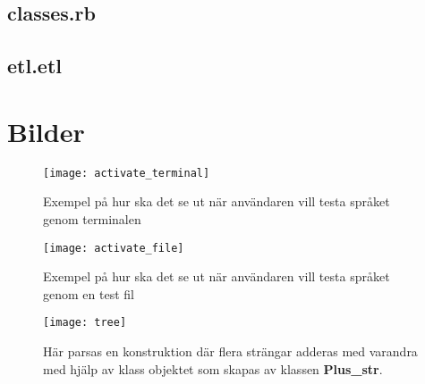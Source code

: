 \documentclass{TDP019mall}
\begin{document}
\newpage
\subsection{classes.rb}


\newpage
\subsection{etl.etl}


\newpage
\section{Bilder}

\begin{figure}[h]
\caption{Exempel på hur ska det se ut när användaren vill testa språket genom terminalen}
\centering
\texttt{[image: activate\_terminal]}
\end{figure}

\begin{figure}[h]
\caption{Exempel på hur ska det se ut när användaren vill testa språket genom en test fil}
\centering
\texttt{[image: activate\_file]}
\end{figure}

\newpage
\begin{figure}[h]
\caption{Här parsas en konstruktion där flera strängar adderas med varandra med hjälp av klass objektet som skapas av klassen \textbf{Plus\_str}.\\ \\}
\centering
\texttt{[image: tree]}
\end{figure}
    
\end{document}
